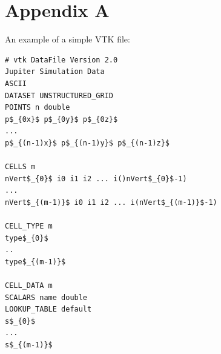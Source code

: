 \documentclass[twocolumn]{aastex62}
\begin{document}
\section*{Appendix A}
An example of a simple VTK file:
\begin{lstlisting}
# vtk DataFile Version 2.0
Jupiter Simulation Data
ASCII
DATASET UNSTRUCTURED_GRID
POINTS n double
p$_{0x}$ p$_{0y}$ p$_{0z}$
...
p$_{(n-1)x}$ p$_{(n-1)y}$ p$_{(n-1)z}$

CELLS m 
nVert$_{0}$ i0 i1 i2 ... i()nVert$_{0}$-1)
...
nVert$_{(m-1)}$ i0 i1 i2 ... i(nVert$_{(m-1)}$-1)

CELL_TYPE m 
type$_{0}$
..
type$_{(m-1)}$

CELL_DATA m
SCALARS name double
LOOKUP_TABLE default
s$_{0}$
...
s$_{(m-1)}$
\end{lstlisting}


\end{document}
